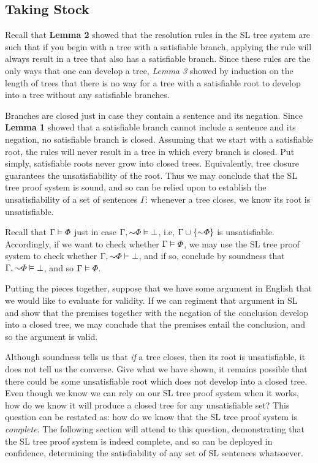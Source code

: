 \label{sec.sl.soundnessproof.end}
\subsection{Taking Stock}

Recall that \textbf{Lemma 2} showed that the resolution rules in the SL tree system are such that if you begin with a tree with a satisfiable branch, applying the rule will always result in a tree that also has a satisfiable branch.
Since these rules are the only ways that one can develop a tree, \textit{Lemma 3} showed by induction on the length of trees that there is no way for a tree with a satisfiable root to develop into a tree without any satisfiable branches.

Branches are closed just in case they contain a sentence and its negation.
Since \textbf{Lemma 1} showed that a satisfiable branch cannot include a sentence and its negation, no satisfiable branch is closed.
Assuming that we start with a satisfiable root, the rules will never result in a tree in which every branch is closed.
Put simply, satisfiable roots never grow into closed trees.
Equivalently, tree closure guarantees the unsatisfiability of the root.
Thus we may conclude that the SL tree proof system is sound, and so can be relied upon to establish the unsatisfiability of a set of sentences $\Gamma$: whenever a tree closes, we know its root is unsatisfiable.

Recall that $\Gamma \vDash \varPhi$ just in case $\Gamma, \enot \metaA \models \bot$, i.e, $\Gamma \cup \set{\enot \metaA}$ is unsatisfiable.
Accordingly, if we want to check whether $\Gamma \vDash \varPhi$, we may use the SL tree proof system to check whether $\Gamma, \enot \metaA \proves \bot$, and if so, conclude by soundness that $\Gamma, \enot \metaA \models \bot$, and so $\Gamma \vDash \varPhi$.

Putting the pieces together, suppose that we have some argument in English that we would like to evaluate for validity.
If we can regiment that argument in SL and show that the premises together with the negation of the conclusion develop into a closed tree, we may conclude that the premises entail the conclusion, and so the argument is valid.

Although soundness tells us that \textit{if} a tree closes, then its root is unsatisfiable, it does not tell us the converse.
Give what we have shown, it remains possible that there could be some unsatisfiable root which does not develop into a closed tree.
Even though we know we can rely on our SL tree proof system when it works, how do we know it will produce a closed tree for any unsatisfiable set?
This question can be restated as: how do we know that the SL tree proof system is \textit{complete}.
The following section will attend to this question, demonstrating that the SL tree proof system is indeed complete, and so can be deployed in confidence, determining the satisfiability of any set of SL sentences whatsoever.



